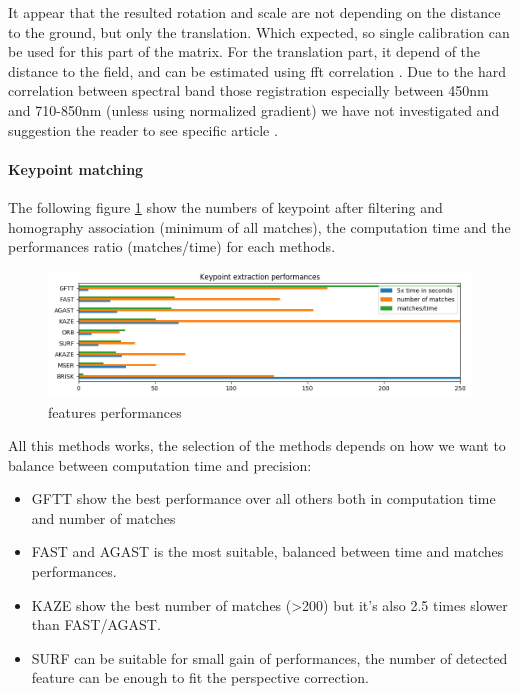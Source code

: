 \documentclass[]{elsarticle}
\begin{document}
	It appear that the resulted rotation and scale are not depending on the distance to the ground, but only the translation.
	Which expected, so single calibration can be used for this part of the matrix.
	For the translation part, it depend of the distance to the field, and can be estimated using fft correlation \cite{506761}.
	Due to the hard correlation between spectral band those registration especially between 450nm and 710-850nm (unless using normalized gradient) we have not investigated and suggestion the reader to see specific article \cite{rabatel:hal-01684135}.
	
	\paragraph{Keypoint matching} 
	The following figure \ref{fig:features-performances} show the numbers of keypoint after filtering and homography association (minimum of all matches),
	the computation time and the performances ratio (matches/time) for each methods.
	
	\begin{figure}[!htb]
		\centering
		\includegraphics[width=\linewidth]{../figures/comparaison-keypoint-performances.png}
		\caption{features performances}
		\label{fig:features-performances}
	\end{figure}
	
	\noindent
	All this methods works, the selection of the methods depends on how we want to balance between computation time and precision:
	\begin{itemize}
		\item GFTT show the best performance over all others both in computation time and number of matches
		\item FAST and AGAST is the most suitable, balanced between time and matches performances.
		\item KAZE show the best number of matches (>200) but it's also 2.5 times slower than FAST/AGAST.
		\item SURF can be suitable for small gain of performances, the number of detected feature can be enough to fit the perspective correction.
	\end{itemize}
	
\end{document}
